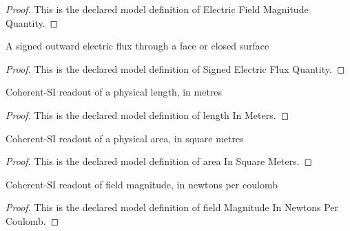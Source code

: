 \begin{proof}
  This is the declared model definition of Electric Field Magnitude Quantity.
\end{proof}
\begin{definition}
  \label{def:physics:phyx-mini-0999:phyxminiproblems-problemphyxmini0999-signedelectricfluxquantity}
  A signed outward electric flux through a face or closed surface
\end{definition}
\begin{proof}
  This is the declared model definition of Signed Electric Flux Quantity.
\end{proof}
\begin{definition}
  \label{def:physics:phyx-mini-0999:phyxminiproblems-problemphyxmini0999-lengthinmeters}
  Coherent-SI readout of a physical length, in metres
\end{definition}
\begin{proof}
  This is the declared model definition of length In Meters.
\end{proof}
\begin{definition}
  \label{def:physics:phyx-mini-0999:phyxminiproblems-problemphyxmini0999-areainsquaremeters}
  Coherent-SI readout of a physical area, in square metres
\end{definition}
\begin{proof}
  This is the declared model definition of area In Square Meters.
\end{proof}
\begin{definition}
  \label{def:physics:phyx-mini-0999:phyxminiproblems-problemphyxmini0999-fieldmagnitudeinnewtonspercoulomb}
  Coherent-SI readout of field magnitude, in newtons per coulomb
\end{definition}
\begin{proof}
  This is the declared model definition of field Magnitude In Newtons Per Coulomb.
\end{proof}
